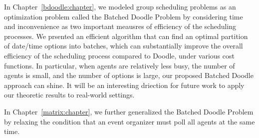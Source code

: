 \label{discussion:chapter}

In Chapter~\ref{bdoodle:chapter}, we modeled group scheduling problems as an optimization problem called the Batched Doodle Problem by considering time and inconvenience as two important meausres of efficiency of the scheduling processes. We prsented an efficient algorithm that can find an optimal partition of date/time options into batches, which can substantially improve the overall efficiency of the scheduling process compared to Doodle, under various cost functions. In particular, when agents are relatively less busy, the number of agents is small, and the number of options is large, our proposed Batched Doodle approach can shine. It will be an interesting driection for future work to apply our theoretic results to real-world settings.

In Chapter~\ref{matrix:chapter}, we further generalized the Batched Doodle Problem by relaxing the condition that an event organizer must poll all agents at the same time. 
